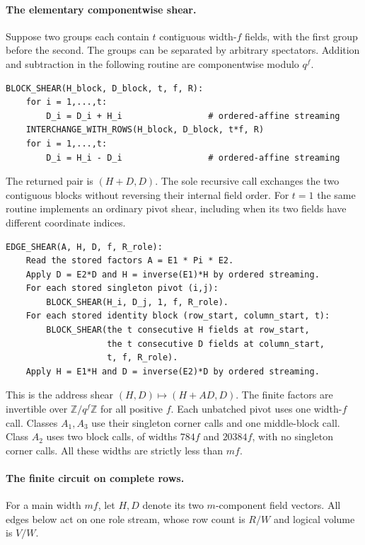 \paragraph{The elementary componentwise shear.}
Suppose two groups each contain $t$ contiguous width-$f$ fields, with the
first group before the second.  The groups can be separated by arbitrary
spectators.  Addition and subtraction in the following routine are
componentwise modulo $q^f$.

\begin{verbatim}
BLOCK_SHEAR(H_block, D_block, t, f, R):
    for i = 1,...,t:
        D_i = D_i + H_i                 # ordered-affine streaming
    INTERCHANGE_WITH_ROWS(H_block, D_block, t*f, R)
    for i = 1,...,t:
        D_i = H_i - D_i                 # ordered-affine streaming
\end{verbatim}

The returned pair is $(H+D,D)$.  The sole recursive call exchanges the
two contiguous blocks without reversing their internal field order.
For $t=1$ the same routine implements an ordinary pivot shear, including
when its two fields have different coordinate indices.

\begin{verbatim}
EDGE_SHEAR(A, H, D, f, R_role):
    Read the stored factors A = E1 * Pi * E2.
    Apply D = E2*D and H = inverse(E1)*H by ordered streaming.
    For each stored singleton pivot (i,j):
        BLOCK_SHEAR(H_i, D_j, 1, f, R_role).
    For each stored identity block (row_start, column_start, t):
        BLOCK_SHEAR(the t consecutive H fields at row_start,
                    the t consecutive D fields at column_start,
                    t, f, R_role).
    Apply H = E1*H and D = inverse(E2)*D by ordered streaming.
\end{verbatim}

This is the address shear $(H,D)\mapsto(H+AD,D)$.
The finite factors are invertible over $\mathbb Z/q^f\mathbb Z$ for
all positive $f$.  Each unbatched pivot uses one width-$f$ call.  Classes $A_1,A_3$
use their singleton corner calls and one middle-block call.  Class $A_2$
uses two block calls, of widths $784f$ and $20384f$, with no singleton
corner calls.  All these widths are strictly less than $mf$.

\paragraph{The finite circuit on complete rows.}
For a main width $mf$, let $H,D$ denote its two $m$-component field
vectors.  All edges below act on one role stream, whose row count is
$R/W$ and logical volume is $V/W$.

